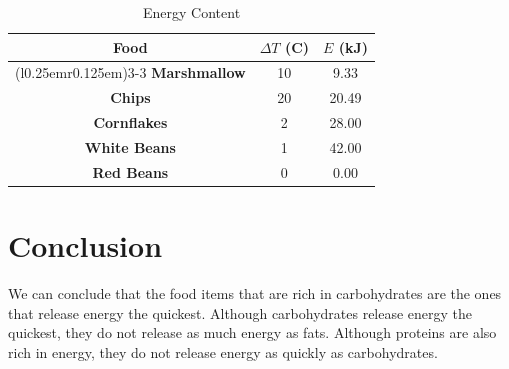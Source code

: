 \documentclass[a4paper, 12pt, english]{article}
\begin{document}
\begin{table}[H]
	\caption{\label{tab:Table 2} Energy Content}
	\centering
	\begin{tabular}{c c c}
		\toprule
		\textbf{Food}                   &
		\textbf{$\Delta T$ (\degree C)} &
		\textbf{$E$ (kJ)}                            \\

		\cmidrule[0.4pt](r{0.125em}){1-1}%
		\cmidrule[0.4pt](lr{0.125em}){2-2}%
		\cmidrule[0.4pt](l{0.25em}r{0.125em}){3-3}%
		\textbf{Marshmallow}            & 10 & 9.33  \\
		\textbf{Chips}                  & 20 & 20.49 \\
		\textbf{Cornflakes}             & 2  & 28.00 \\
		\textbf{White Beans}            & 1  & 42.00 \\
		\textbf{Red Beans}              & 0  & 0.00  \\
	\end{tabular}
\end{table}
\section{Conclusion}
We can conclude that the food items that are rich in carbohydrates are the ones
that release energy the quickest. Although carbohydrates release energy the
quickest, they do not release as much energy as fats. Although proteins are
also rich in energy, they do not release energy as quickly as carbohydrates.
\end{document}
